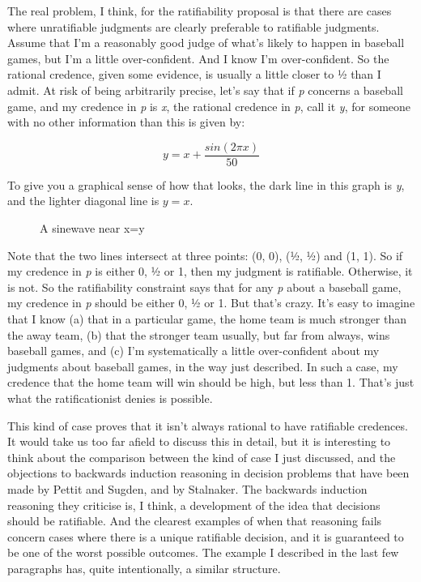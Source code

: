\documentclass[
  11pt,
  letterpaper,
  DIV=11,
  numbers=noendperiod,
  twoside]{scrartcl}
\makeatletter
\newcommand*\pandocbounded[1]{%
  \sbox\pandoc@box{#1}%
  \Gscale@div\@tempa{\textheight}{\dimexpr\ht\pandoc@box+\dp\pandoc@box\relax}%
  \Gscale@div\@tempb{\linewidth}{\wd\pandoc@box}%
  \ifdim\@tempb\p@<\@tempa\p@\let\@tempa\@tempb\fi%
  \ifdim\@tempa\p@<\p@\scalebox{\@tempa}{\usebox\pandoc@box}%
  \else\usebox{\pandoc@box}%
  \fi%
}
\makeatother
\begin{document}
The real problem, I think, for the ratifiability proposal is that there
are cases where unratifiable judgments are clearly preferable to
ratifiable judgments. Assume that I'm a reasonably good judge of what's
likely to happen in baseball games, but I'm a little over-confident. And
I know I'm over-confident. So the rational credence, given some
evidence, is usually a little closer to ½ than I admit. At risk of being
arbitrarily precise, let's say that if \emph{p} concerns a baseball
game, and my credence in \emph{p} is \emph{x}, the rational credence in
\emph{p}, call it \emph{y}, for someone with no other information than
this is given by:

\[y = x + \frac{sin(2\pi x)}{50}\]

To give you a graphical sense of how that looks, the dark line in this
graph is \emph{y}, and the lighter diagonal line is \(y = x\).

\begin{figure}[H]

{\centering \pandocbounded{\texttt{[image: sinewave.JPG]}}

}

\caption{A sinewave near x=y}

\end{figure}%

Note that the two lines intersect at three points: (0, 0), (½, ½) and
(1, 1). So if my credence in \emph{p} is either 0, ½ or 1, then my
judgment is ratifiable. Otherwise, it is not. So the ratifiability
constraint says that for any \emph{p} about a baseball game, my credence
in \emph{p} should be either 0, ½ or 1. But that's crazy. It's easy to
imagine that I know (a) that in a particular game, the home team is much
stronger than the away team, (b) that the stronger team usually, but far
from always, wins baseball games, and (c) I'm systematically a little
over-confident about my judgments about baseball games, in the way just
described. In such a case, my credence that the home team will win
should be high, but less than 1. That's just what the ratificationist
denies is possible.

This kind of case proves that it isn't always rational to have
ratifiable credences. It would take us too far afield to discuss this in
detail, but it is interesting to think about the comparison between the
kind of case I just discussed, and the objections to backwards induction
reasoning in decision problems that have been made by Pettit and Sugden,
and by Stalnaker. The backwards induction reasoning they criticise is, I
think, a development of the idea that decisions should be ratifiable.
And the clearest examples of when that reasoning fails concern cases
where there is a unique ratifiable decision, and it is guaranteed to be
one of the worst possible outcomes. The example I described in the last
few paragraphs has, quite intentionally, a similar structure.
\end{document}
